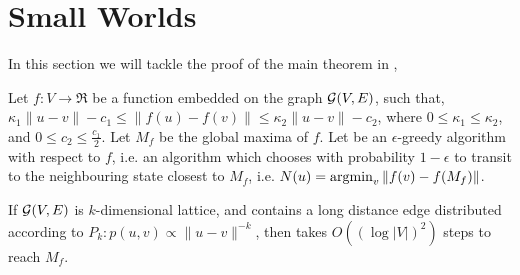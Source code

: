 \section{Small Worlds}
\label{sec:small-world-theory}

In this section we will tackle the proof of the main theorem in
,

\begin{theorem}
  Let $f : V \to \Re$ be a function embedded on the graph $\mathcal{G}(V,E)$,
  such that, $\kappa_1 \|u-v\| - c_1 \le \|f(u) - f(v)\| \le \kappa_2
  \|u - v\| - c_2$, where $0 \le \kappa_1 \le \kappa_2$, and $0 \le c_2
  \le \frac{c_1}{2}$. Let $M_f$ be the global maxima of $f$. Let
  \egreedyalgo be an $\epsilon$-greedy algorithm with respect to $f$,
  i.e.  an algorithm which chooses with probability $1-\epsilon$ to
  transit to the neighbouring state closest to $M_f$, i.e. $N(u)
  = \operatorname{argmin}_v \|f(v) - f(M_f)\|$.
  
  If $\mathcal{G}(V,E)$ is $k$-dimensional lattice, and contains a long
  distance edge distributed according to $P_k: p(u,v) \propto
  \|u-v\|^{-k}$, then \egreedyalgo takes $O( (\log |V|)^2 )$ steps to
  reach $M_f$.
\end{theorem}
